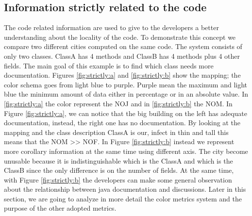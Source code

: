 \documentclass[]{usiinfbachelorproject}
\begin{document}
\subsection{Information strictly related to the code}
The code related information are used to give to the developers a better understanding about the locality of the code. To demonstrate this concept we compare two different cities computed on the same code. The system  consists of only two classes. ClassA has 4 methods and ClassB has 4 methods plus 4 other fields. The main goal of this example is to find which class needs more documentation. 
Figures \ref{fig:strictly:a} and \ref{fig:strictly:b} show the mapping; the color schema goes from light blue to purple.
Purple mean the maximum and light blue the minimum amount of data either  in percentage or in an absolute value.
In \ref{fig:strictly:a} the color represent the NOJ and in \ref{fig:strictly:b} the NOM.
In Figure \ref{fig:strictly:a}, we can notice that the big building on the left has adequate documentation, instead, the right one has no documentation. By looking at the mapping and the class description ClassA is our, infect in thin and tall this means that  the NOM >> NOF.
In Figure \ref{fig:strictly:b} instead we represent more corollary information at the same time using different axis. The city become unusable because it is indistinguishable which is the ClassA and which is the ClassB since the only difference is on the number of fields. At the same time, with Figure \ref{fig:strictly:b} the developers can make some general observation about the relationship between java documentation and discussions.
Later in this section, we are going to analyze in more detail the color metrics system and the purpose of the other adopted metrics.

 
 
 
 
\end{document}
